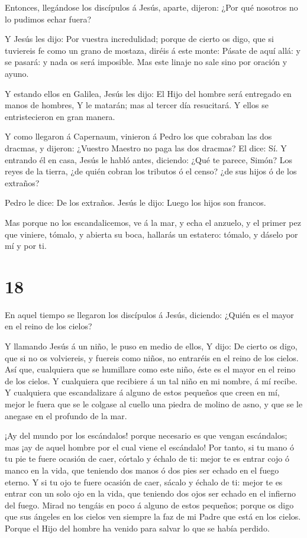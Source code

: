  Entonces, llegándose los discípulos á Jesús, aparte,
dijeron: ¿Por qué nosotros no lo pudimos echar fuera?

 Y Jesús les dijo: Por vuestra incredulidad; porque de
cierto os digo, que si tuviereis fe como un grano de mostaza, diréis á
este monte: Pásate de aquí allá: y se pasará: y nada os será imposible.
 Mas este linaje no sale sino por oración y ayuno.

 Y estando ellos en Galilea, Jesús les dijo: El Hijo del
hombre será entregado en manos de hombres,  Y le matarán;
mas al tercer día resucitará. Y ellos se entristecieron en gran manera.

 Y como llegaron á Capernaum, vinieron á Pedro los que
cobraban las dos dracmas, y dijeron: ¿Vuestro Maestro no paga las dos
dracmas?  El dice: Sí. Y entrando él en casa, Jesús le
habló antes, diciendo: ¿Qué te parece, Simón? Los reyes de la tierra,
¿de quién cobran los tributos ó el censo? ¿de sus hijos ó de los
extraños?

 Pedro le dice: De los extraños. Jesús le dijo: Luego los
hijos son francos.

 Mas porque no los escandalicemos, ve á la mar, y echa el
anzuelo, y el primer pez que viniere, tómalo, y abierta su boca,
hallarás un estatero: tómalo, y dáselo por mí y por ti.

\hypertarget{section-17}{%
\section{18}\label{section-17}}

 En aquel tiempo se llegaron los discípulos á Jesús,
diciendo: ¿Quién es el mayor en el reino de los cielos?

 Y llamando Jesús á un niño, le puso en medio de ellos,
 Y dijo: De cierto os digo, que si no os volviereis, y
fuereis como niños, no entraréis en el reino de los cielos. 
Así que, cualquiera que se humillare como este niño, éste es el mayor en
el reino de los cielos.  Y cualquiera que recibiere á un tal
niño en mi nombre, á mí recibe.  Y cualquiera que
escandalizare á alguno de estos pequeños que creen en mí, mejor le fuera
que se le colgase al cuello una piedra de molino de asno, y que se le
anegase en el profundo de la mar.

 ¡Ay del mundo por los escándalos! porque necesario es que
vengan escándalos; mas ¡ay de aquel hombre por el cual viene el
escándalo!  Por tanto, si tu mano ó tu pie te fuere ocasión
de caer, córtalo y échalo de ti: mejor te es entrar cojo ó manco en la
vida, que teniendo dos manos ó dos pies ser echado en el fuego eterno.
 Y si tu ojo te fuere ocasión de caer, sácalo y échalo de
ti: mejor te es entrar con un solo ojo en la vida, que teniendo dos ojos
ser echado en el infierno del fuego.  Mirad no tengáis en
poco á alguno de estos pequeños; porque os digo que sus ángeles en los
cielos ven siempre la faz de mi Padre que está en los cielos.
 Porque el Hijo del hombre ha venido para salvar lo que se
había perdido.

